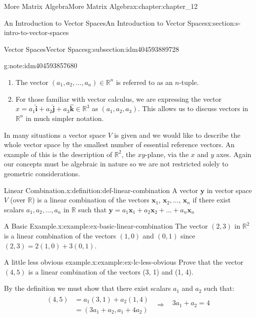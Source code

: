 \documentclass[twoside,10pt,]{book}
\numberwithin{equation}{section}
\renewcommand{\vec}[1]{\mathbf{#1}}
\begin{document}
\begin{chapterptx}{More Matrix Algebra}{}{More Matrix Algebra}{}{}{x:chapter:chapter_12}
\begin{sectionptx}{An Introduction to Vector Spaces}{}{An Introduction to Vector Spaces}{}{}{x:section:s-intro-to-vector-spaces}
\begin{subsectionptx}{Vector Spaces}{}{Vector Spaces}{}{}{g:subsection:idm404593889728}
\begin{note}{}{g:note:idm404593857680}
\begin{enumerate}[label=(\arabic*)]
\item{}The vector \(\left(a_1,a_2,\ldots ,a_n\right)\in \mathbb{R}^n\) is referred to as an \(n\)-tuple.%
\item{}For those familiar with vector calculus, we are expressing the vector \(x = a_1 \boldsymbol{\hat{\textbf{i}}}+ a_2 \boldsymbol{\hat{\textbf{j}}} + a_3 \boldsymbol{\hat{\textbf{k}}} \in \mathbb{R}^3\) as \(\left(a_1,a_2,a_3\right)\). This allows us to discuss vectors in \(\mathbb{R}^n\) in much simpler notation.%
\end{enumerate}
%
\end{note}
In many situations a vector space \(V\) is given and we would like to describe the whole vector space by the smallest number of essential reference vectors. An example of this is the description of \(\mathbb{R}^2\), the \(x y\)-plane, via the \(x\) and \(y\) axes. Again our concepts must be algebraic in nature so we are not restricted solely to geometric considerations.%
\begin{definition}{Linear Combination.}{x:definition:def-linear-combination}%
%
\label{g:notation:idm404593843120}%
A vector \(\pmb{ y}\) in vector space \(V\) (over \(\mathbb{R}\)) is a linear combination of the vectors \(\vec{x}_1\), \(\vec{x}_2, \ldots\), \(\vec{x}_n\) if there exist scalars \(a_1,a_2,\ldots ,a_n\) in \(\mathbb{R}\) such that \(\vec{y}
= a_1\vec{x}_1+ a_2\vec{x}_2+\ldots +a_n\vec{x}_n\)%
\end{definition}
\begin{example}{A Basic Example.}{x:example:ex-basic-linear-combination}%
The vector \((2, 3)\) in \(\mathbb{R}^2\) is a linear combination of the vectors \((1, 0)\) and \((0, 1)\) since \((2, 3) =
2(1, 0) + 3(0, 1)\).%
\end{example}
\begin{example}{A little less obvious example.}{x:example:ex-lc-less-obvious}%
Prove that the vector \((4,5)\) is a linear combination of the vectors (3, 1) and (1, 4).%
\par
By the definition we must show that there exist scalars \(a_1\) and \(a_2\) such that:%
\begin{equation*}
\begin{array}{ccc}
\begin{split}
(4,5) &= a_1(3, 1) + a_2 (1, 4)\\ 
& = \left(3a_1+ a_2 , a_1+4a_2\right)
\end{split} &\Rightarrow & 
\begin{array}{c}
3a_1+ a_2 =4\\

\end{array}
\end{array}
\end{equation*}
\end{example}
\end{subsectionptx}
\end{sectionptx}
\end{chapterptx}
\end{document}
